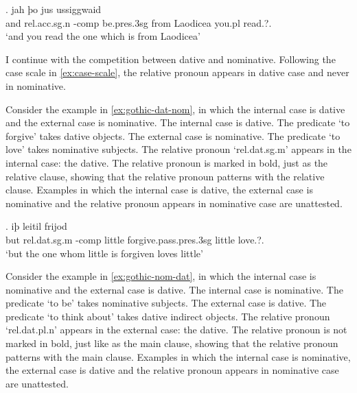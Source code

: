 \exg. jah þo     jus ussiggwaid\\
 and \ac{rel}.\ac{acc}.\ac{sg}.\ac{n} -\ac{comp} be.\ac{pres}.3\ac{sg}\scsub{[nom]} from Laodicea you.\ac{pl} read.?.\scsub{[acc]}\\
 `and you read the one which is from Laodicea' \label{ex:gothic-nom-acc-rep}

I continue with the competition between dative and nominative. Following the case scale in \ref{ex:case-scale}, the relative pronoun appears in dative case and never in nominative.

Consider the example in \ref{ex:gothic-dat-nom}, in which the internal case is dative and the external case is nominative.
The internal case is dative. The predicate  `to forgive' takes dative objects.
The external case is nominative. The predicate  `to love' takes nominative subjects.
The relative pronoun  `\ac{rel}.\ac{dat}.\ac{sg}.\ac{m}' appears in the internal case: the dative. The relative pronoun is marked in bold, just as the relative clause, showing that the relative pronoun patterns with the relative clause.
Examples in which the internal case is dative, the external case is nominative and the relative pronoun appears in nominative case are unattested.

\exg. iþ     leitil frijod\\
 but \ac{rel}.\ac{dat}.\ac{sg}.\ac{m} -\ac{comp} little {forgive}.\ac{pass}.\ac{pres}.3\ac{sg}\scsub{[dat]} little love.?.\scsub{[nom]}\\
 `but the one whom little is forgiven loves little' \label{ex:gothic-dat-nom}

Consider the example in \ref{ex:gothic-nom-dat}, in which the internal case is nominative and the external case is dative.
The internal case is nominative. The predicate  `to be' takes nominative subjects.
The external case is dative. The predicate  `to think about' takes dative indirect objects.
The relative pronoun  `\ac{rel}.\ac{dat}.\ac{pl}.\ac{n}' appears in the external case: the dative. The relative pronoun is not marked in bold, just like as the main clause, showing that the relative pronoun patterns with the main clause.
Examples in which the internal case is nominative, the external case is dative and the relative pronoun appears in nominative case are unattested.

